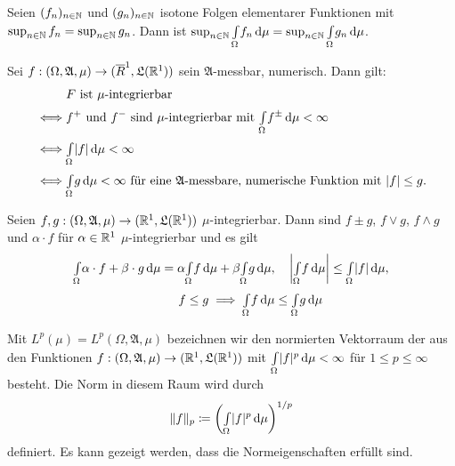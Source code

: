 \documentclass{cheat-sheet}
\newcommand{\Alg}{\mathfrak{A}}
\newcommand{\LebAlg}{\mathfrak{L}} %
\newcommand{\IntOmu}[1]{\Int{\Omega}{}{#1}{\mu}} %
\begin{document}
\begin{satz}
  Seien $(f_n)_{n \in \mathbb{N}}$ und $(g_n)_{n \in \mathbb{N}}$ isotone Folgen elementarer Funktionen mit $\sup_{n \in \mathbb{N}} f_n = \sup_{n \in \mathbb{N}} g_n$. Dann ist $\sup_{n \in \N} \IntOmu{f_n} = \sup_{n \in \N} \IntOmu{g_n}$.
\end{satz}



\begin{satz}
  Sei $f : (\Omega, \Alg, \mu) \to (\overline{R}^1, \LebAlg(\R^1))$ sein $\Alg$-messbar, numerisch. Dann gilt:
  \begin{align*}
    & \text{$F$ ist $\mu$-integrierbar} \\
    \iff & \text{$f^+$ und $f^-$ sind $\mu$-integrierbar mit $\IntOmu{f^{\pm}} < \infty$} \\
    \iff & \IntOmu{|f|} < \infty \\
    \iff & \IntOmu{g} < \infty \text{ für eine $\Alg$-messbare, numerische Funktion mit $|f| \leq g$}.
  \end{align*}
\end{satz}

\begin{satz}
  Seien $f, g : (\Omega, \Alg, \mu) \to (\R^1, \LebAlg(\R^1))$ $\mu$-integrierbar. Dann sind $f \pm g$, $f \vee g$, $f \wedge g$ und $\alpha \cdot f$ für $\alpha \in \mathbb{R}^1$ $\mu$-integrierbar und es gilt
  \begin{align*}
    \IntOmu{\alpha \cdot f + \beta \cdot g} = \alpha \IntOmu{f} + \beta \IntOmu{g}, & \quad
    \left| \IntOmu{f} \right| \leq \IntOmu{|f|}, \\
    f \leq g \implies \IntOmu{f} &\leq \IntOmu{g}
  \end{align*}
\end{satz}

\begin{defn}
  Mit $L^p(\mu) = L^p(\Omega, \Alg, \mu)$ bezeichnen wir den normierten Vektorraum der aus den Funktionen $f : (\Omega, \Alg, \mu) \to (\R^1, \LebAlg(\R^1))$ mit $\IntOmu{|f|^p} < \infty$ für $1 \leq p \leq \infty$ besteht. Die Norm in diesem Raum wird durch
  \[ \|f\|_p \coloneqq \left( \IntOmu{|f|^p} \right)^{1/p} \]
  definiert. Es kann gezeigt werden, dass die Normeigenschaften erfüllt sind.
\end{defn}
\end{document}
